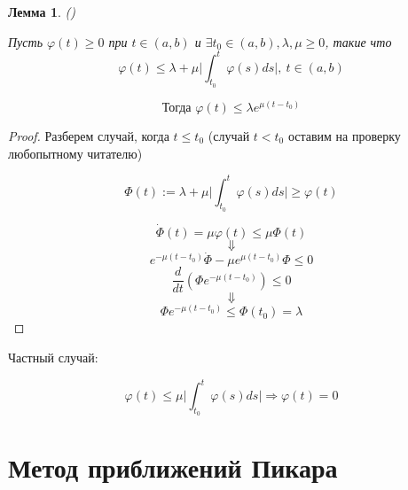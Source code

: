 \documentclass[a4paper]{article}
\theoremstyle{indented}
\newtheorem*{lemma}{Лемма}
\theoremstyle{definition}
\theoremstyle{remark}
\begin{document}
\begin{lemma}
  ()

  Пусть $\varphi(t) \geqslant 0$ при $t \in (a,b)$ и  $\exists t_0 \in (a,b), \lambda, \mu \geqslant 0$, такие что
  \[\varphi (t) \leqslant \lambda + \mu \bigg|\int_{t_0}^{t}\varphi (s) ds \bigg| , \ t \in (a,b)\]

  \[\text{Тогда } \varphi (t) \leqslant \lambda e^{\mu(t - t_0)}\]

\end{lemma}
\begin{proof}
  Разберем случай, когда $t \leqslant t_0$ (случай $t < t_0$ оставим на проверку любопытному читателю)

  \[\Phi(t) := \lambda + \mu \bigg|\int_{t_0}^{t}\varphi (s) ds \bigg| \geqslant \varphi (t)\]

  \[\dot \Phi(t) = \mu \varphi (t) \leqslant \mu \Phi(t)\]
  \[\Downarrow \]
  \[e^{-\mu(t-t_0)} \dot \Phi - \mu e^{\mu(t-t_0)}\Phi \leqslant 0\]
  \[\frac{d}{dt} (\Phi e^{-\mu(t-t_0)}) \leqslant 0 \]
  \[\Downarrow \]
  \[\Phi e^{-\mu(t-t_0)} \leqslant \Phi(t_0) = \lambda\]
  
\end{proof}


Частный случай:

\[\varphi(t) \leqslant  \mu \bigg|\int_{t_0}^{t}\varphi (s) ds \bigg| \Rightarrow \varphi (t) = 0\]

\section{Метод приближений Пикара}
\end{document}

